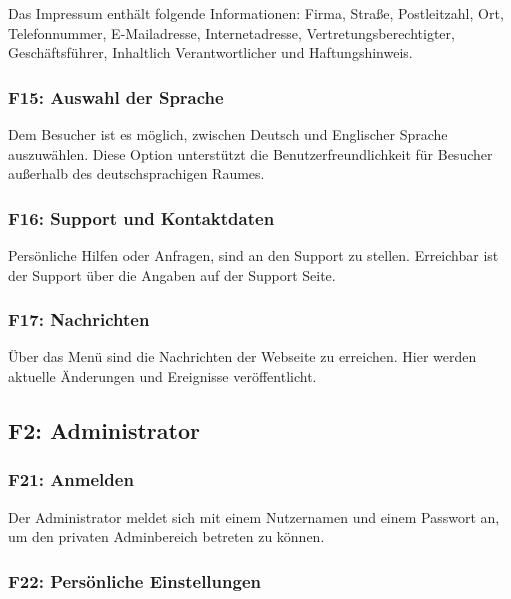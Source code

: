\documentclass[10pt,a4paper]{scrartcl}
\begin{document}
Das Impressum enthält folgende Informationen: Firma, Straße, Postleitzahl, Ort, Telefonnummer, E-Mailadresse, Internetadresse, Vertretungsberechtigter, \\ Geschäftsführer, Inhaltlich Verantwortlicher und Haftungshinweis.

%

\subsubsection*{F15: Auswahl der Sprache}

Dem Besucher ist es möglich, zwischen Deutsch und Englischer Sprache auszuwählen. Diese Option unterstützt die Benutzerfreundlichkeit für Besucher außerhalb des deutschsprachigen Raumes.

\subsubsection*{F16: Support und Kontaktdaten}

Persönliche Hilfen oder Anfragen, sind an den Support zu stellen. Erreichbar ist der Support \"uber die Angaben auf der Support Seite.

\subsubsection*{F17: Nachrichten}
Über das Menü sind die Nachrichten der Webseite zu erreichen. Hier werden aktuelle Änderungen und Ereignisse veröffentlicht.

\subsection{F2: Administrator}

\subsubsection*{F21: Anmelden}

Der Administrator meldet sich mit einem Nutzernamen und einem Passwort an, um den privaten Adminbereich betreten zu können.

\subsubsection*{F22: Persönliche Einstellungen}
\end{document}
